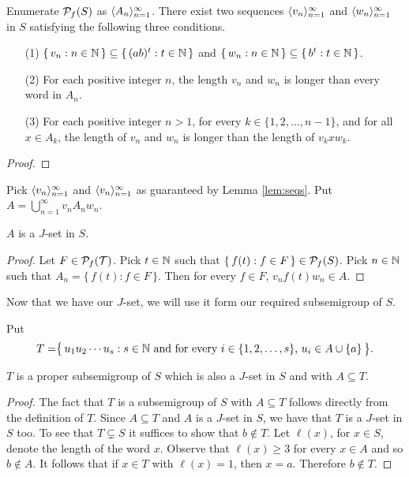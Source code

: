 \begin{lem}
  \label{lem:seqs}
  Enumerate $\mathcal{P}_f(S)$ as $\langle A_n \rangle_{n=1}^\infty$.
  There exist two sequences $\langle v_n \rangle_{n=1}^\infty$ and $\langle w_n \rangle_{n=1}^\infty$ in $S$ satisfying the following three conditions.
  \begin{itemize}
    \item[(1)]
      $\{\, v_n : n \in \mathbb{N} \,\} \subseteq \{\, (ab)^t : t \in \mathbb{N} \,\}$ and $\{\, w_n : n \in \mathbb{N} \,\} \subseteq \{\, b^t : t \in \mathbb{N} \,\}$.

    \item[(2)]
      For each positive integer $n$, the length $v_n$ and $w_n$ is longer than every word in $A_n$.

    \item[(3)]
      For each positive integer $n > 1$, for every $k \in \{1, 2, \ldots, n-1\}$, and for all $x \in A_k$, the length of $v_n$ and $w_n$ is longer than the length of $v_kxw_k$.
  \end{itemize}
\end{lem}
\begin{proof}
\end{proof}

\begin{defn}
  Pick $\langle v_n \rangle_{n=1}^\infty$ and $\langle v_n \rangle_{n=1}^\infty$ as guaranteed by Lemma \ref{lem:seqs}.
  Put $A = \bigcup_{n=1}^\infty v_nA_nw_n$.
\end{defn}

\begin{lem}
  $A$ is a $J$-set in $S$. 
\end{lem}
\begin{proof}
  Let $F \in \mathcal{P}_f(\mathcal{T})$.
  Pick $t \in \mathbb{N}$ such that $\{\, f(t) : f \in F\,\} \in \mathcal{P}_f(S)$.
  Pick $n \in \mathbb{N}$ such that $A_n = \{\, f(t) : f \in F\,\}$. 
  Then for every $f \in F$, $v_nf(t)w_n \in A$. 
\end{proof}

Now that we have our $J$-set, we will use it form our required subsemigroup of $S$.

\begin{defn}
  Put 
  \[
    T = \bigr\{\, u_1u_2\cdots u_s : \mbox{$s \in \mathbb{N}$ and for every $i \in \{1, 2, \ldots, s\}$, $u_i \in A \cup\{a\}$} \,\bigr\}.
  \]
\end{defn}

\begin{lem}
  $T$ is a proper subsemigroup of $S$ which is also a $J$-set in $S$ and with $A \subseteq T$.
\end{lem}
\begin{proof}
  The fact that $T$ is a subsemigroup of $S$ with $A \subseteq T$ follows directly from the definition of $T$.
  Since $A \subseteq T$ and $A$ is a $J$-set in $S$, we have that $T$ is a $J$-set in $S$ too.
  To see that $T \subsetneq S$ it suffices to show that $b \not\in T$.
  Let $\ell(x)$, for $x \in S$, denote the length of the word $x$.
  Observe that $\ell(x) \ge 3$ for every $x \in A$ and so $b \not\in A$.
  It follows that if $x \in T$ with $\ell(x) = 1$, then $x = a$.
  Therefore $b \not\in T$. 
\end{proof}

